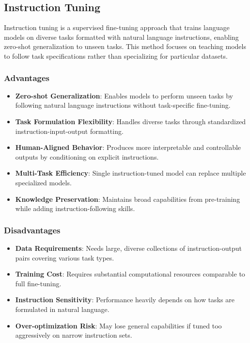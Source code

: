 \subsection{Instruction Tuning}

Instruction tuning is a supervised fine-tuning approach that trains language models on diverse tasks formatted with natural language instructions, enabling zero-shot generalization to unseen tasks. This method focuses on teaching models to follow task specifications rather than specializing for particular datasets.

\subsubsection{Advantages}
\begin{itemize}
    \item \textbf{Zero-shot Generalization}: Enables models to perform unseen tasks by following natural language instructions without task-specific fine-tuning.
    
    \item \textbf{Task Formulation Flexibility}: Handles diverse tasks through standardized instruction-input-output formatting.
    
    \item \textbf{Human-Aligned Behavior}: Produces more interpretable and controllable outputs by conditioning on explicit instructions.
    
    \item \textbf{Multi-Task Efficiency}: Single instruction-tuned model can replace multiple specialized models.
    
    \item \textbf{Knowledge Preservation}: Maintains broad capabilities from pre-training while adding instruction-following skills.
\end{itemize}

\subsubsection{Disadvantages}
\begin{itemize}
    \item \textbf{Data Requirements}: Needs large, diverse collections of instruction-output pairs covering various task types.
    
    \item \textbf{Training Cost}: Requires substantial computational resources comparable to full fine-tuning.
    
    \item \textbf{Instruction Sensitivity}: Performance heavily depends on how tasks are formulated in natural language.
    
    \item \textbf{Over-optimization Risk}: May lose general capabilities if tuned too aggressively on narrow instruction sets.
\end{itemize}

